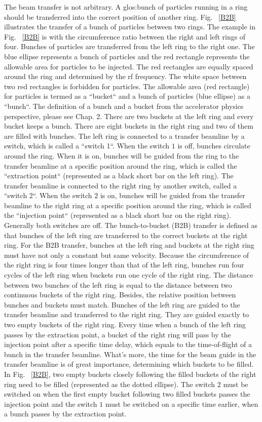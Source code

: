 The beam transfer is not arbitrary. A \gls{glos:bunch} of particles running in a ring should be transferred into the correct position of another ring. Fig. ~\ref{B2B} illustrates the transfer of a bunch of particles between two rings. The example in Fig. ~\ref{B2B} is with the circumference ratio between the right and left rings of four. Bunches of particles are transferred from the left ring to the right one. The blue ellipse represents a bunch of particles and the red rectangle represents the allowable area for particles to be injected. The red rectangles are equally spaced around the ring and determined by the rf frequency. The white space between two red rectangles is forbidden for particles. The allowable area (red rectangle) for particles is termed as a ``bucket`` and a bunch of particles (blue ellipse) as a ``bunch``. The definition of a bunch and a bucket from the accelerator physics perspective, please see Chap. 2. There are two buckets at the left ring and every bucket keeps a bunch. There are eight buckets in the right ring and two of them are filled with bunches. The left ring is connected to a transfer beamline by a switch, which is called a ``switch 1``. When the switch $1$ is off, bunches circulate around the ring. When it is on, bunches will be guided from the ring to the transfer beamline at a specific position around the ring, which is called the ``extraction point`` (represented as a black short bar on the left ring). The transfer beamline is connected to the right ring by another switch, called a ``switch 2``. When the switch $2$ is on, bunches will be guided from the transfer beamline to the right ring at a specific position around the ring, which is called the ``injection point`` (represented as a black short bar on the right ring). Generally both switches are off. The bunch-to-bucket (B2B) transfer is defined as that bunches of the left ring are transferred to the correct buckets at the right ring. For the B2B transfer, bunches at the left ring and buckets at the right ring must have not only a constant but same velocity. Because the circumference of the right ring is four times longer than that of the left ring, bunches run four cycles of the left ring when buckets run one cycle of the right ring. The distance between two bunches of the left ring is equal to the distance between two continuous buckets of the right ring. Besides, the relative position between bunches and buckets must match. Bunches of the left ring are guided to the transfer beamline and transferred to the right ring. They are guided exactly to two empty buckets of the right ring. Every time when a bunch of the left ring passes by the extraction point, a bucket of the right ring will pass by the injection point after a specific time delay, which equals to the time-of-flight of a bunch in the transfer beamline. What's more, the time for the beam guide in the transfer beamline is of great importance, determining which buckets to be filled. In Fig. ~\ref{B2B}, two empty buckets closely following the filled buckets of the right ring need to be filled (represented as the dotted ellipse). The switch $2$ must be switched on when the first empty bucket following two filled buckets passes the injection point and the switch $1$ must be switched on a specific time earlier, when a bunch passes by the extraction point. 

